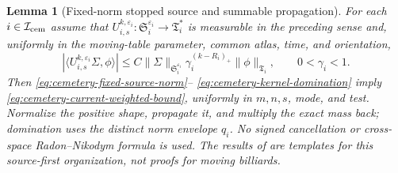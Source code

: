 \documentclass[11pt]{article}
\newtheorem{lemma}[theorem]{Lemma}
\begin{document}
\begin{lemma}[Fixed-norm stopped source and summable propagation]
\label{lem:stopped-source-propagation}
For each $i\in\mathcal I_{\rm cem}$ assume that
$U_{i,s}^{k,\varepsilon_i}:\mathfrak S_i^{\varepsilon_i}\to
\mathfrak T_i^*$ is measurable in the preceding sense and, uniformly in the
moving-table parameter, common atlas, time, and orientation,
\begin{equation}
\label{eq:stopped-source-propagation}
 |\langle U_{i,s}^{k,\varepsilon_i}\Sigma,\phi\rangle|
 \le C\|\Sigma\|_{\mathfrak S_i^{\varepsilon_i}}
       \gamma_i^{(k-R_i)_+}\|\phi\|_{\mathfrak T_i},
 \qquad 0<\gamma_i<1.
\end{equation}
Then \eqref{eq:cemetery-fixed-source-norm}--
\eqref{eq:cemetery-kernel-domination} imply
\eqref{eq:cemetery-current-weighted-bound}, uniformly in $m,n,s$, mode, and
test.  Normalize the positive shape, propagate it, and multiply the exact
mass back; domination uses the distinct norm envelope $q_i$.  No signed
cancellation or cross-space Radon--Nikodym formula is
used.  The results of \cite{CanestrariPerturb,CanestrariHoles} are templates
for this source-first organization, not proofs for moving billiards.
\end{lemma}
\end{document}
